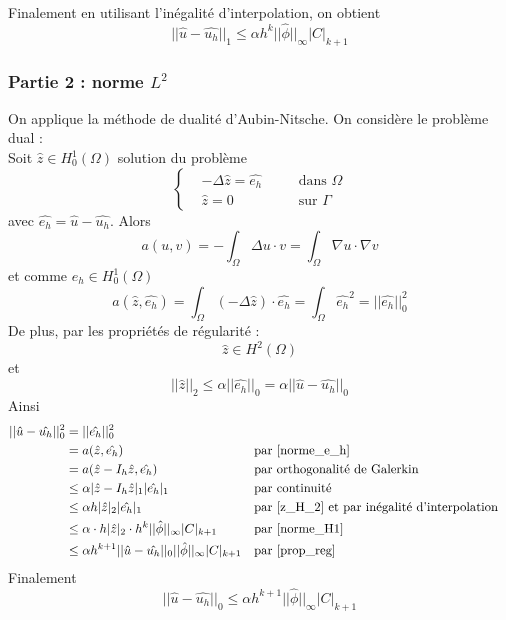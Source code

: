Finalement en utilisant l'inégalité d'interpolation, on obtient
\begin{equation}
	\boxed{||\hat{u}-\hat{u_h}||_1\le\alpha h^k ||\hat{\phi}||_\infty |C|_{k+1}}
	\label{norme_H1}
\end{equation} 

\subsubsection*{Partie 2 : norme $L^2$}

On applique la méthode de dualité d'Aubin-Nitsche. On considère le problème dual : \\
Soit $\hat{z}\in H_0^1(\Omega)$ solution du problème
$$\left\{\begin{aligned}
	&-\Delta\hat{z}=\hat{e_h} \quad &&\text{dans }\Omega \\
	&\hat{z}=0 \quad &&\text{sur } \Gamma
\end{aligned}\right.$$
avec $\hat{e_h}=\hat{u}-\hat{u_h}$.
Alors
$$a(u,v)=-\int_\Omega\Delta u\cdot v=\int_\Omega\nabla u\cdot\nabla v$$
et comme $e_h\in H_0^1(\Omega)$
\begin{equation}
	a(\hat{z},\hat{e_h})=\int_\Omega(-\Delta \hat{z})\cdot \hat{e_h}=\int_\Omega \hat{e_h}^2=||\hat{e_h}||_0^2
	\label{norme_e_h}
\end{equation}
De plus, par les propriétés de régularité : 
\begin{equation}
	\hat{z}\in H^2(\Omega)
	\label{z_H_2}
\end{equation}
et
\begin{equation}
	||\hat{z}||_2\le \alpha||\hat{e_h}||_0 =\alpha||\hat{u}-\hat{u_h}||_0
	\label{prop_reg}
\end{equation}
Ainsi
\begin{align*}
	||\hat{u}-\hat{u_h}||_0^2&=||\hat{e_h}||_0^2 \\
	&=a(\hat{z},\hat{e_h}) &&\text{par \ref{norme_e_h}} \\
	&=a(\hat{z}-I_h\hat{z},\hat{e_h}) &&\text{par orthogonalité de Galerkin} \\
	&\le\alpha|\hat{z}-I_h\hat{z}|_1|\hat{e_h}|_1 &&\text{par continuité} \\
	&\le\alpha h|\hat{z}|_2|\hat{e_h}|_1 &&\text{par \ref{z_H_2} et par inégalité d'interpolation} \\
	&\le\alpha \cdot h|\hat{z}|_2 \cdot h^k||\hat{\phi}||_\infty |C|_{k+1} &&\text{par \ref{norme_H1}} \\
	&\le\alpha h^{k+1}||\hat{u}-\hat{u_h}||_0||\hat{\phi}||_\infty |C|_{k+1} &&\text{par \ref{prop_reg}}
\end{align*}
Finalement
\begin{equation}
	\boxed{||\hat{u}-\hat{u_h}||_0\le\alpha h^{k+1}||\hat{\phi}||_\infty |C|_{k+1}}
\end{equation}

